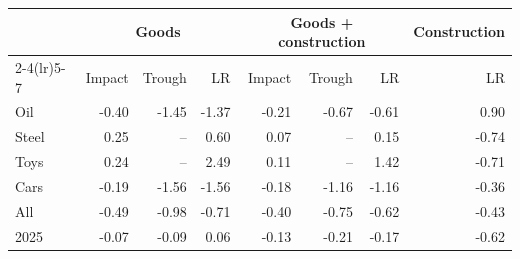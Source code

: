 \begin{tabular}{lrrrrrrr}
\toprule
 & \multicolumn{3}{c}{Goods} & \multicolumn{3}{c}{Goods + construction} & Construction \\
\cmidrule(lr){2-4}\cmidrule(lr){5-7}
 & Impact & Trough & LR & Impact & Trough & LR & LR \\
\midrule
Oil & -0.40 & -1.45 & -1.37 & -0.21 & -0.67 & -0.61 & 0.90 \\
Steel & 0.25 & -- & 0.60 & 0.07 & -- & 0.15 & -0.74 \\
Toys & 0.24 & -- & 2.49 & 0.11 & -- & 1.42 & -0.71 \\
Cars & -0.19 & -1.56 & -1.56 & -0.18 & -1.16 & -1.16 & -0.36 \\
All & -0.49 & -0.98 & -0.71 & -0.40 & -0.75 & -0.62 & -0.43 \\
2025 & -0.07 & -0.09 & 0.06 & -0.13 & -0.21 & -0.17 & -0.62 \\
\bottomrule
\end{tabular}
